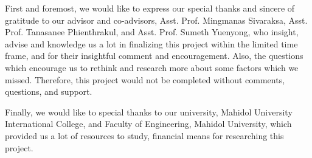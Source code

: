 First and foremost, we would like to express our special thanks and sincere of gratitude to our advisor and co-advisors, Asst. Prof. Mingmanas Sivaraksa, Asst. Prof. Tanasanee Phienthrakul, and Asst. Prof. Sumeth Yuenyong, who insight, advise and knowledge us a lot in finalizing this project within the limited time frame, and for their insightful comment and encouragement. Also, the questions which encourage us to rethink and research more about some factors which we missed. Therefore, this project would not be completed without comments, questions, and support.

Finally, we would like to special thanks to our university, Mahidol University International College, and Faculty of Engineering, Mahidol University, which provided us a lot of resources to study, financial means for researching this project.
